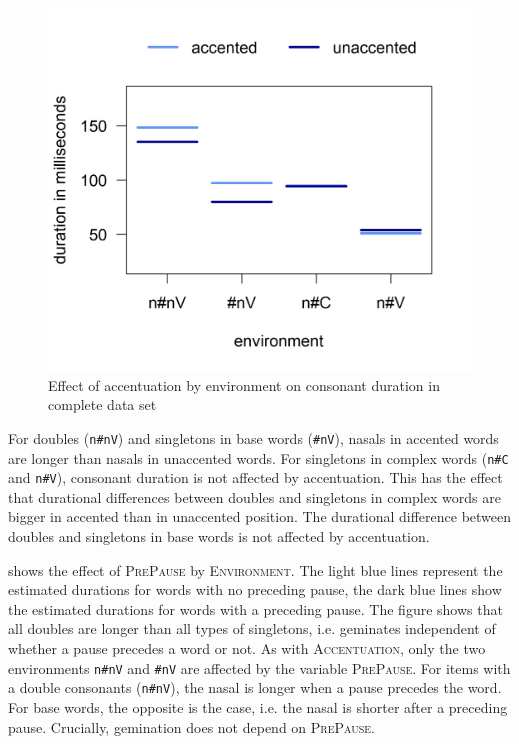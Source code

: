 \begin{figure} [h!]
	\centering
	\includegraphics [scale=0.5] {images/Experiment/unModelCompleteInterEnvAcc}
	
	\caption{Effect of accentuation by environment on consonant duration in complete data set}
	\label{fig:NumNasal Acc un experiment}
\end{figure}


 For  doubles (\texttt{n\#nV}) and singletons in base words (\texttt{\#nV}), nasals in accented words are longer than nasals in unaccented words.
For singletons in complex words (\texttt{n\#C} and \texttt{n\#V}), consonant duration is not affected by accentuation. This has the effect that durational differences between doubles and singletons in complex words are bigger in accented than in unaccented position. The durational difference between doubles and singletons in base words is not affected by accentuation.







 shows the effect of \textsc{PrePause} by \textsc{Environment}. The light blue lines represent the estimated durations for words with no preceding pause, the dark blue lines show the estimated durations for words with a preceding pause. 
The figure shows that all doubles are longer than all types of singletons, i.e.  geminates independent of whether a pause precedes a word or not.
As with \textsc{Accentuation}, only the two environments \texttt{n\#nV} and \texttt{\#nV} are affected by the variable \textsc{PrePause}. For items with a double consonants (\texttt{n\#nV}), the nasal is longer when a pause precedes the word. For base words, the opposite is the case, i.e. the nasal is shorter after a preceding pause.
Crucially, gemination does not depend on \textsc{PrePause}. 

